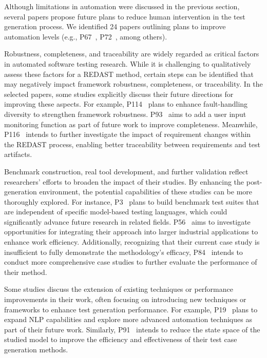 Although limitations in automation were discussed in the previous section, several papers propose future plans to reduce human intervention in the test generation process. We identified 24 papers outlining plans to improve automation levels (e.g., P67~, P72~, among others).

Robustness, completeness, and traceability are widely regarded as critical factors in automated software testing research. While it is challenging to qualitatively assess these factors for a REDAST method, certain steps can be identified that may negatively impact framework robustness, completeness, or traceability. In the selected papers, some studies explicitly discuss their future directions for improving these aspects. For example, P114~ plans to enhance fault-handling diversity to strengthen framework robustness. P93~ aims to add a user input monitoring function as part of future work to improve completeness. Meanwhile, P116~ intends to further investigate the impact of requirement changes within the REDAST process, enabling better traceability between requirements and test artifacts.

Benchmark construction, real tool development, and further validation reflect researchers’ efforts to broaden the impact of their studies. By enhancing the post-generation environment, the potential capabilities of these studies can be more thoroughly explored. For instance, P3~ plans to build benchmark test suites that are independent of specific model-based testing languages, which could significantly advance future research in related fields. P56~ aims to investigate opportunities for integrating their approach into larger industrial applications to enhance work efficiency. Additionally, recognizing that their current case study is insufficient to fully demonstrate the methodology’s efficacy, P84~ intends to conduct more comprehensive case studies to further evaluate the performance of their method.

Some studies discuss the extension of existing techniques or performance improvements in their work, often focusing on introducing new techniques or frameworks to enhance test generation performance. For example, P19~ plans to expand NLP capabilities and explore more advanced automation techniques as part of their future work. Similarly, P91~ intends to reduce the state space of the studied model to improve the efficiency and effectiveness of their test case generation methods.

